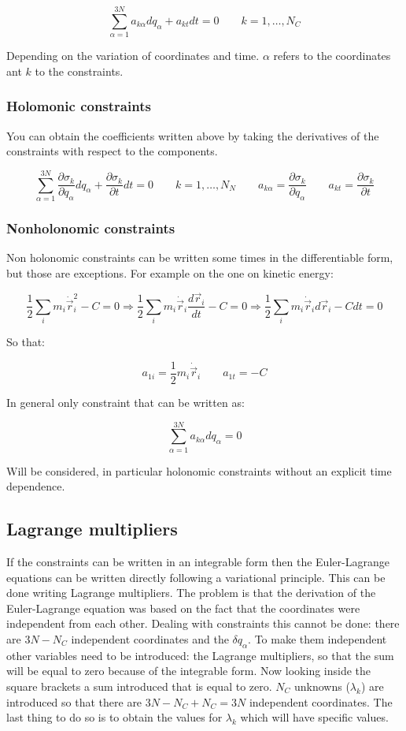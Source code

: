 	$$\sum\limits_{\alpha = 1}^{3N} a_{k\alpha}dq_\alpha + a_{kt}dt = 0\qquad k = 1, \dots, N_C$$

	Depending on the variation of coordinates and time.
	$\alpha$ refers to the coordinates ant $k$ to the constraints.

		\subsubsection{Holomonic constraints}
		You can obtain the coefficients written above by taking the derivatives of the constraints with respect to the components.

		$$\sum\limits_{\alpha=1}^{3N}\frac{\partial\sigma_k}{\partial q_\alpha}dq_\alpha + \frac{\partial\sigma_k}{\partial t} dt = 0\qquad k = 1, \dots, N_N\qquad a_{k\alpha} = \frac{\partial\sigma_k}{\partial q_\alpha}\qquad a _{kt} = \frac{\partial\sigma_k}{\partial t}$$

		\subsubsection{Nonholonomic constraints}
		Non holonomic constraints can be written some times in the differentiable form, but those are exceptions. For example on the one on kinetic energy:

		$$\frac{1}{2}\sum\limits_i m_i\dot{\vec{r}}_i^2 - C = 0\Rightarrow\frac{1}{2}\sum\limits_i m_i\dot{\vec{r}}_i\frac{d\vec{r}_i}{dt} - C = 0\Rightarrow\frac{1}{2}\sum\limits_i m_i\dot{\vec{r}}_id\vec{r}_i-Cdt = 0$$

		So that:

		$$a_{1i}=\frac{1}{2}m_i\dot{\vec{r}}_i\qquad a_{1t} = -C$$

		In general only constraint that can be written as:

		$$\sum\limits_{\alpha=1}^{3N}a_{k\alpha}dq_\alpha=0$$

		Will be considered, in particular holonomic constraints without an explicit time dependence.

	\subsection{Lagrange multipliers}
	If the constraints can be written in an integrable form then the Euler-Lagrange equations can be written directly following a variational principle.
	This can be done writing Lagrange multipliers.
	The problem is that the derivation of the Euler-Lagrange equation was based on the fact that the coordinates were independent from each other.
	Dealing with constraints this cannot be done: there are $3N-N_C$ independent coordinates and the $\delta q_\alpha$.
	To make them independent other variables need to be introduced: the Lagrange multipliers, so that the sum will be equal to zero because of the integrable form.
	Now looking inside the square brackets a sum introduced that is equal to zero.
	$N_C$ unknowns ($\lambda_k$) are introduced so that there are $3N-N_C+N_C=3N$ independent coordinates.
	The last thing to do so is to obtain the values for $\lambda_k$ which will have specific values.

